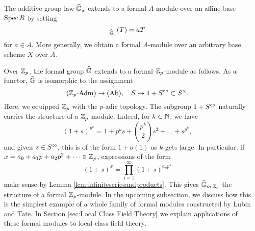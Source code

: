 \documentclass[../main.tex]{subfiles}
\begin{document}
\begin{xpl}
  The additive group law $\widehat{\mathbb{G}}_a$ extends to a formal $A$-module over an affine base $\operatorname{Spec} R$ by setting 
  \begin{equation*}
    [a]_{\Ghat_a}(T) = aT
  \end{equation*}
  for $a \in A$. More generally, we obtain a formal $A$-module over an arbitrary base scheme $X$ over $A$.

  Over $\mathbb{Z}_p$, the formal group $\widehat{\mathbb{G}}$ extends to a formal $\mathbb{Z}_p$-module as follows. 
  As a functor, $\widehat{\mathbb{G}}$ is isomorphic to the assignment
  \begin{equation*}
    {({\mathbb{Z}_p}\text-\allowbreak\mathrm{Adm})} \to {(\mathrm{Ab})}, \quad S \mapsto 1 + S^{\circ \hspace{-0.5pt} \circ} \subset S^\times.
  \end{equation*}
  Here, we equipped $\mathbb{Z}_p$ with the $p$-adic topology.
  The subgroup $1 + S^{\circ \hspace{-0.5pt} \circ}$ naturally carries the structure of a $\mathbb{Z}_p$-module.
  Indeed, for $k \in \mathbb{N}$, we have
  \begin{equation*}
    (1+s)^{p^k} = 1 + p^ks + \binom{p^k}2 s^2 + \dots + s^{p^k},
  \end{equation*}
  and given $s \in S^{\circ \hspace{-0.5pt} \circ}$, this is of the form $1+ o(1)$ as $k$ gets large. 
  In particular, if $x = a_0 + a_1 p + a_2p^2 + \dots \in \mathbb{Z}_p$, expressions of  the form
  \begin{equation*}
    (1+s)^x = \prod_{i = 1}^\infty (1+s)^{a_k p^k}
  \end{equation*}
  make sense by Lemma \ref{lem:infiniteseriesandproducts}. This gives
  $\widehat{\mathbb{G}}_{m,\mathbb{Z}_p}$ the structure of a formal $\mathbb{Z}_p$-module. 
  In the upcoming subsection, we discuss how this is the simplest example of a
  whole family of formal modules constructed by 
  Lubin and Tate. In Section \ref{sec:Local Class Field Theory} we explain applications of these formal modules to local class field theory.
\end{xpl}
\end{document}
